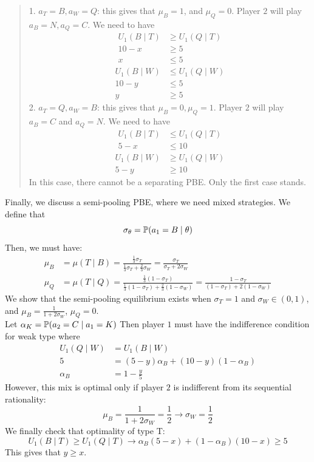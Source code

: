 \begin{quote}
    1. $a_T = B, a_W = Q$: this gives that $\mu_B = 1$, and $\mu_Q = 0$. Player $2$ will play $a_B = N, a_Q = C$. We need to have
    \begin{align*}
        U_1(B \mid T) &\ge U_1(Q \mid T) \\
        10 - x &\ge 5 \\
        x &\le 5
    \end{align*}
    \begin{align*}
        U_1(B \mid W) &\le U_1(Q \mid W) \\
        10 - y &\le 5 \\
        y &\ge 5
    \end{align*}
    2. $a_T = Q, a_W = B$: this gives that $\mu_B = 0, \mu_Q = 1$. Player $2$ will play $a_B = C$ and $a_Q = N$. We need to have
    \begin{align*}
        U_1(B \mid T) &\le U_1(Q \mid T) \\
        5 - x &\le 10
    \end{align*}
    \begin{align*}
        U_1(B \mid W) &\ge U_1(Q \mid W) \\
        5 - y &\ge 10
    \end{align*}
    In this case, there cannot be a separating PBE. Only the first case stands.
\end{quote}
Finally, we discuss a semi-pooling PBE, where we need mixed strategies. We define that
$$\sigma_\theta = \mathbb{P}(a_1 = B \mid \theta)$$
Then, we must have:
\begin{align*}
    \mu_B &= \mu(T \mid B) = \frac{\frac{1}{3}\sigma_T}{\frac{1}{3}\sigma_T + \frac{2}{3}\sigma_W} = \frac{\sigma_T}{\sigma_T + 2\sigma_W} \\
    \mu_Q &= \mu(T \mid Q) = \frac{\frac{1}{3}(1 - \sigma_T)}{\frac{1}{3}(1-\sigma_T) + \frac{2}{3}(1 - \sigma_W)} = \frac{1 - \sigma_T}{(1 - \sigma_T) + 2(1-\sigma_W)}
\end{align*}
We show that the semi-pooling equilibrium exists when $\sigma_T = 1$ and $\sigma_W \in (0, 1)$, and $\mu_B = \frac{1}{1 + 2\sigma_W}$, $\mu_Q = 0$. \\
Let $\alpha_K = \mathbb{P}(a_2 = C \mid a_1 = K)$
Then player $1$ must have the indifference condition for weak type where
\begin{align*}
    U_1(Q \mid W) &= U_1(B \mid W) \\
    5 &= (5 - y)\alpha_B  + (10 -y)(1 - \alpha_B) \\
    \alpha_B &= 1-\frac{y}{5}
\end{align*}
However, this mix is optimal only if player $2$ is indifferent from its sequential rationality:
$$\mu_B = \frac{1}{1 + 2\sigma_W} = \frac{1}{2} \to \sigma_W = \frac{1}{2}$$
We finally check that optimality of type T:
$$U_1(B \mid T) \ge U_1(Q \mid T) \to \alpha_B(5 - x) + (1-\alpha_B)(10 - x) \ge 5$$
This gives that $y \ge x$.



\newpage